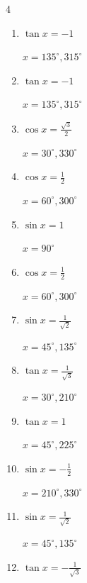 \begin{multicols}{4}
\begin{enumerate}
        $\displaystyle x = 150^{\circ} , 210^{\circ}$

  \item $\displaystyle \tan{x}  = -1$

        $\displaystyle x = 135^{\circ} , 315^{\circ}$

  \item $\displaystyle \tan{x}  = -1$

        $\displaystyle x = 135^{\circ} , 315^{\circ}$

  \item $\displaystyle \cos{x}  = \frac{\sqrt{3}}{2}$

        $\displaystyle x = 30^{\circ} , 330^{\circ}$

  \item $\displaystyle \cos{x}  = \frac{1}{2}$

        $\displaystyle x = 60^{\circ} , 300^{\circ}$

  \item $\displaystyle \sin{x}  = 1$

        $\displaystyle x = 90^{\circ}$

  \item $\displaystyle \cos{x}  = \frac{1}{2}$

        $\displaystyle x = 60^{\circ} , 300^{\circ}$

  \item $\displaystyle \sin{x}  = \frac{1}{\sqrt{2}}$

        $\displaystyle x = 45^{\circ} , 135^{\circ}$

  \item $\displaystyle \tan{x}  = \frac{1}{\sqrt{3}}$

        $\displaystyle x = 30^{\circ} , 210^{\circ}$

  \item $\displaystyle \tan{x}  = 1$

        $\displaystyle x = 45^{\circ} , 225^{\circ}$

  \item $\displaystyle \sin{x}  = -\frac{1}{2}$

        $\displaystyle x = 210^{\circ} , 330^{\circ}$

  \item $\displaystyle \sin{x}  = \frac{1}{\sqrt{2}}$

        $\displaystyle x = 45^{\circ} , 135^{\circ}$

  \item $\displaystyle \tan{x}  = -\frac{1}{\sqrt{3}}$


\end{enumerate}
\end{multicols}
